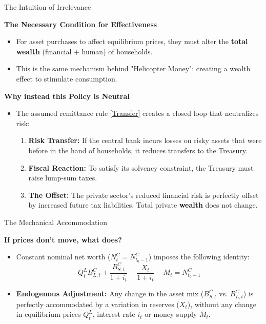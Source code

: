 \documentclass[11pt,aspectratio=169]{beamer}
\begin{document}
\begin{frame}{The Intuition of Irrelevance}
\small

\textbf{The Necessary Condition for Effectiveness}
\begin{itemize}
    \item For asset purchases to affect equilibrium prices, they must alter the \textbf{total wealth} (financial + human) of households.
    \item This is the same mechanism behind "Helicopter Money": creating a wealth effect to stimulate consumption.
\end{itemize}

\vspace{0.2cm}

\textbf{Why instead this Policy is Neutral}
\begin{itemize}
    \item The assumed remittance rule \eqref{Transfer} creates a closed loop that neutralizes risk:
    \begin{enumerate}
        \item \textbf{Risk Transfer:} If the central bank  incurs losses on risky assets that were before in the hand of households, it reduces transfers to the Treasury.
        \item \textbf{Fiscal Reaction:} To satisfy its solvency constraint, the Treasury must raise lump-sum taxes.
        \item \textbf{The Offset:} The private sector's reduced financial risk is perfectly offset by increased future tax liabilities. Total private \textbf{wealth} does not change.
    \end{enumerate}
\end{itemize}
\end{frame}

\begin{frame}{The Mechanical Accommodation}
\small

\textbf{If prices don't move, what does?}
\begin{itemize}
    \item Constant nominal net worth ($N_t^C = N_{t_0-1}^C$) imposes the following identity:
    \begin{equation*}
        Q_{t}^{L}B_{L,t}^{C}+\frac{B_{S,t}^{C}}{1+i_{t}}-\frac{X_{t}}{1+i_{t}}-M_{t}=N_{t_{0}-1}^{C}
    \end{equation*}
    \item \textbf{Endogenous Adjustment:} Any change in the asset mix ($B_{S,t}^{C}$ vs. $B_{L,t}^{C}$) is perfectly accommodated by a variation in reserves ($X_t$), without any change in equilibrium prices $Q_{t}^{L}$, interest rate $i_t$ or money supply $M_t$.
\end{itemize}
\end{frame}
\end{document}
